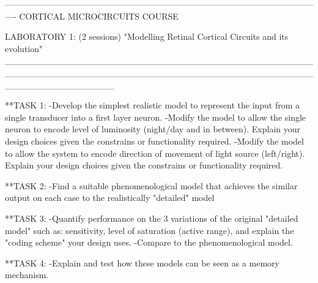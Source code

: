 ----------------------------------------------------------------------------------------------------------------
CORTICAL MICROCIRCUITS COURSE

LABORATORY 1: (2 sessions)
"Modelling Retinal Cortical Circuits and its evolution"
_________________________________________________________________________________________________________________


**TASK 1:
-Develop the simplest realistic model to represent the input from a single transducer into a first layer neuron.
-Modify the model to allow the single neuron to encode level of luminosity (night/day and in between). Explain your design choices given the constrains or functionality required.
-Modify the model to allow the system to encode direction of movement of light source (left/right). Explain your design choices given the constrains or functionality required.


**TASK 2:
-Find a suitable phenomenological model that achieves the similar output on each case to the realistically "detailed" model

**TASK 3:
-Quantify performance on the 3 variations of the original "detailed model" such as: sensitivity, level of saturation (active range), and explain the "coding scheme" your design uses.
-Compare to the phenomenological model.

**TASK 4:
-Explain and test how these models can be seen as a memory mechanism.